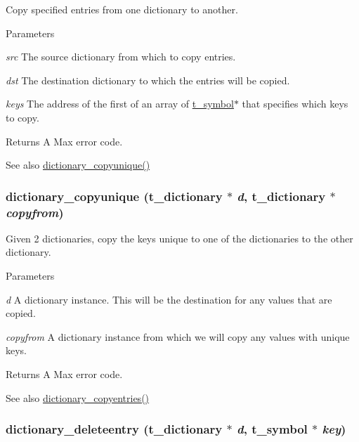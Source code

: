 Copy specified entries from one dictionary to another. 
\begin{DoxyParams}{Parameters}
\item[{\em src}]The source dictionary from which to copy entries. \item[{\em dst}]The destination dictionary to which the entries will be copied. \item[{\em keys}]The address of the first of an array of \hyperlink{structt__symbol}{t\_\-symbol}$\ast$ that specifies which keys to copy. \end{DoxyParams}
\begin{DoxyReturn}{Returns}
A Max error code.
\end{DoxyReturn}
\begin{DoxySeeAlso}{See also}
\hyperlink{group__dictionary_gaef48a5cc22bc4c8b0fb23c7b7c3aa6a8}{dictionary\_\-copyunique()} 
\end{DoxySeeAlso}
\hypertarget{group__dictionary_gaef48a5cc22bc4c8b0fb23c7b7c3aa6a8}{
\subsubsection[{dictionary\_\-copyunique}]{ dictionary\_\-copyunique ({\bf t\_\-dictionary} $\ast$ {\em d}, \/  {\bf t\_\-dictionary} $\ast$ {\em copyfrom})}}
\label{group__dictionary_gaef48a5cc22bc4c8b0fb23c7b7c3aa6a8}


Given 2 dictionaries, copy the keys unique to one of the dictionaries to the other dictionary. 
\begin{DoxyParams}{Parameters}
\item[{\em d}]A dictionary instance. This will be the destination for any values that are copied. \item[{\em copyfrom}]A dictionary instance from which we will copy any values with unique keys. \end{DoxyParams}
\begin{DoxyReturn}{Returns}
A Max error code.
\end{DoxyReturn}
\begin{DoxySeeAlso}{See also}
\hyperlink{group__dictionary_ga53ef6b088fed8ef360292a659a383487}{dictionary\_\-copyentries()} 
\end{DoxySeeAlso}
\hypertarget{group__dictionary_gadc367d6d95aa0144c902d05d165f7412}{
\subsubsection[{dictionary\_\-deleteentry}]{ dictionary\_\-deleteentry ({\bf t\_\-dictionary} $\ast$ {\em d}, \/  {\bf t\_\-symbol} $\ast$ {\em key})}}
\label{group__dictionary_gadc367d6d95aa0144c902d05d165f7412}


